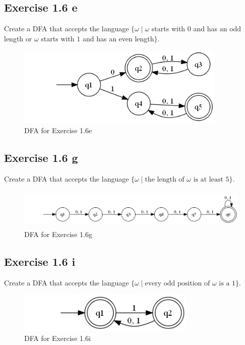 \documentclass{article}
\newcommand{\where}{\mid}
\begin{document}
\subsection{Exercise 1.6 e}

Create a DFA that accepts the language $\{ \omega \where \omega $ starts
with $0$ and has an odd length or $\omega$ starts with $1$ and has an even
length$\}$.

\begin{figure}[h!]
	\includegraphics[height=1.5in]{1_6_e.png}
	\caption{DFA for Exercise 1.6e}
\end{figure}

\subsection{Exercise 1.6 g}

Create a DFA that accepts the language $\{ \omega \where \text{the length of }
\omega \text{ is at least } 5 \}$.

\begin{figure}[h!]
	\includegraphics[height=0.75in]{1_6_g.png}
	\caption{DFA for Exercise 1.6g}
\end{figure}

\newpage

\subsection{Exercise 1.6 i}

Create a DFA that accepts the language $\{ \omega \where \text{every odd
position of } \omega \text{ is a } 1 \}$.

\begin{figure}[h!]
	\includegraphics[height=0.75in]{1_6_i.png}
	\caption{DFA for Exercise 1.6i}
\end{figure}
\end{document}
